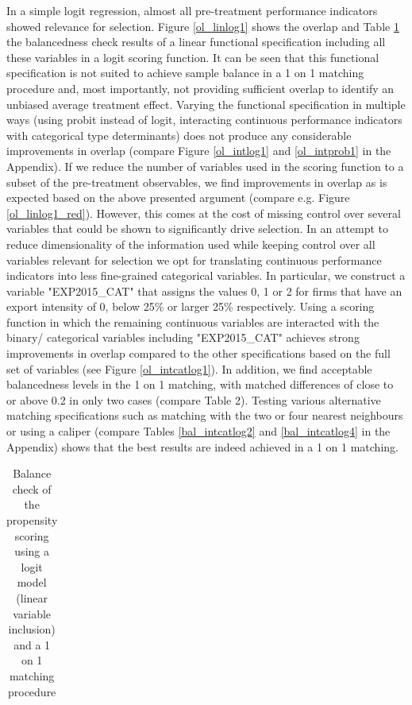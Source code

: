  In a simple logit regression, almost all pre-treatment performance indicators showed relevance for selection. Figure \ref{ol_linlog1} shows the overlap and Table \ref{bal_linlog1} the balancedness check results of a linear functional specification including all these variables in a logit scoring function. It can be seen that this functional specification is not suited to achieve sample balance in a 1 on 1 matching procedure and, most importantly, not providing sufficient overlap to identify an unbiased average treatment effect. Varying the functional specification in multiple ways (using probit instead of logit, interacting continuous performance indicators with categorical type determinants) does not produce any considerable improvements in overlap (compare Figure \ref{ol_intlog1} and \ref{ol_intprob1} in the Appendix). If we reduce the number of variables used in the scoring function to a subset of the pre-treatment observables, we find improvements in overlap as is expected based on the above presented argument (compare e.g. Figure \ref{ol_linlog1_red}). However, this comes at the cost of missing control over several variables that could be shown to significantly drive selection. In an attempt to reduce dimensionality of the information used while keeping control over all variables relevant for selection we opt for translating continuous performance indicators into less fine-grained categorical variables. In particular, we construct a variable "EXP2015\_CAT" that assigns the values 0, 1 or 2 for firms that have an export intensity of 0, below 25\% or larger 25\% respectively. Using a scoring function in which the remaining continuous variables are interacted with the binary/ categorical variables including "EXP2015\_CAT" achieves strong improvements in overlap compared to the other specifications based on the full set of variables (see Figure \ref{ol_intcatlog1}). In addition, we find acceptable balancedness levels in the 1 on 1 matching, with matched differences of close to or above 0.2 in only two cases (compare Table 2). Testing various alternative matching specifications such as matching with the two or four nearest neighbours or using a caliper (compare Tables \ref{bal_intcatlog2} and \ref{bal_intcatlog4} in the Appendix) shows that the best results are indeed achieved in a 1 on 1 matching. \\ \par

\begin{table}
	\centering
		\caption{Balance check of the propensity scoring using a logit model (linear variable inclusion) and a 1 on 1 matching procedure}
	\label{bal_linlog1}
\begin{tabular}{lcccc}
	\hline \hline
	
	\hline \hline
\end{tabular}
\end{table}

